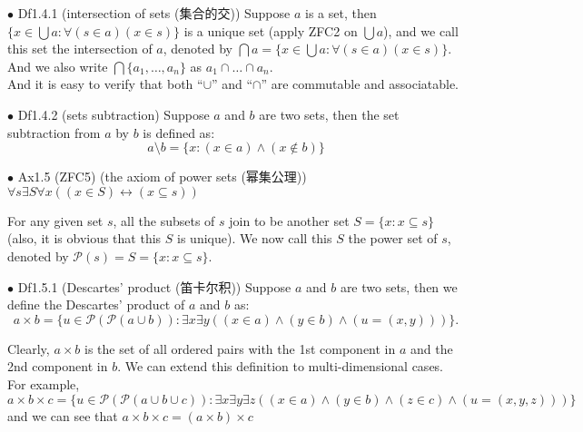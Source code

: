\documentclass{article}
\begin{document}
\begin{Df}{$\bullet$ Df1.4.1 (intersection of sets (集合的交))}
    \textcolor{Th}{Suppose $a$ is a set, then $\{x\in \bigcup a: \forall (s\in a) (x\in s)\}$ is a unique set (apply ZFC2 on $\bigcup a$)}, and we call this set the intersection of $a$, denoted by $\bigcap a = \{x\in \bigcup a: \forall (s\in a) (x\in s)\}$. And we also write $\bigcap\{a_1,\dots, a_n\}$ as $a_1\cap \dots \cap a_n$.\\
    And it is easy to verify that \textcolor{Th}{both ``$\cup$'' and ``$\cap$'' are commutable and associatable.}
\end{Df}

\begin{Df}{$\bullet$ Df1.4.2 (sets subtraction)}
    Suppose $a$ and $b$ are two sets, then the set subtraction from $a$ by $b$ is defined as: $$a\setminus b = \{x: (x\in a)\land (x\notin b)\}$$
\end{Df}

\begin{Ax}{$\bullet$ Ax1.5 (ZFC5) (the axiom of power sets (幂集公理))}
    \textcolor{Ax}{$\forall s\exists S\forall x \left((x\in S)\leftrightarrow (x\subseteq s)\right)$}
\end{Ax}
For any given set $s$, all the subsets of $s$ join to be another set $S = \{x: x\subseteq s\}$ (\textcolor{Th}{also, it is obvious that this $S$ is unique}). \textcolor{Df}{We now call this $S$ the power set of $s$, denoted by $\mathcal{P}(s) = S = \{x: x\subseteq s\}$.}

\begin{Df}{$\bullet$ Df1.5.1 (Descartes' product (笛卡尔积))}
    Suppose $a$ and $b$ are two sets, then we define the Descartes' product of $a$ and $b$ as:
    $$a\times b = \{u\in \mathcal{P}(\mathcal{P}(a\cup b)): \exists x\exists y \left((x\in a)\land (y\in b)\land (u=(x,y))\right)\}.$$
\end{Df}
Clearly, $a\times b$ is the set of all ordered pairs with the 1st component in $a$ and the 2nd component in $b$.
We can extend this definition to multi-dimensional cases. For example, 
$$a\times b\times c = \{u\in \mathcal{P}(\mathcal{P}(a\cup b\cup c)): \exists x\exists y\exists z \left((x\in a)\land (y\in b)\land (z\in c)\land (u=(x,y,z))\right)\}$$
and we can see that \textcolor{Th}{$a\times b\times c = (a\times b)\times c$}
\end{document}
